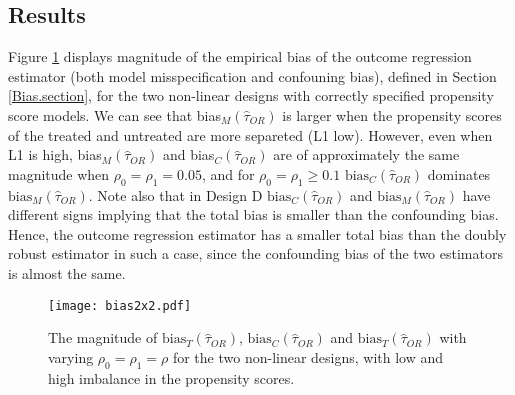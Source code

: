 \documentclass[11pt]{article}
\newcommand{\bias}{\mbox{bias}}
\begin{document}
\subsection{Results}
Figure \ref{Bias.fig} displays magnitude of the empirical bias of the outcome regression estimator (both model misspecification and confouning bias), defined in Section \ref{Bias.section}, for the two non-linear designs with correctly specified propensity score models. We can see that bias$_M(\hat \tau_{OR})$ is larger when the propensity scores of the treated and untreated are more separeted (L1 low). However, even when L1 is high, bias$_M(\hat \tau_{OR})$ and bias$_C(\hat \tau_{OR})$ are of approximately the same magnitude when $\rho_0=\rho_1 = 0.05$, and for $\rho_0=\rho_1 \geq 0.1$ $\bias_C(\hat \tau_{OR})$ dominates $\bias_M(\hat \tau_{OR})$. Note also that in Design D $\bias_C(\hat \tau_{OR})$ and $\bias_M(\hat \tau_{OR})$ have different signs implying that the total bias is smaller than the confounding bias. Hence, the outcome regression estimator has a smaller total bias than the doubly robust estimator in such a case, since the confounding bias of the two estimators is almost the same. 

\begin{figure} [htbp]
\centering
\texttt{[image: bias2x2.pdf]}
\caption{The magnitude of $\bias_T(\hat\tau_{OR})$, $\bias_C(\hat\tau_{OR})$ and $\bias_T(\hat\tau_{OR})$ with varying $\rho_0=\rho_1=\rho$ for the two non-linear designs, with low and high imbalance in the propensity scores. }
\label{Bias.fig}
\end{figure}
\end{document}
